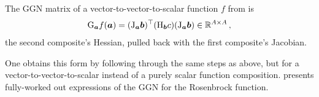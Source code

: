 \begin{definition}\label{def:vector_ggn}
  The GGN matrix of a vector-to-vector-to-scalar function $f$ from  is
  \begin{align*}
    \mathrm{G}_{{\bm{a}}} f({\bm{a}})
    =
    (\mathrm{J}_{{\bm{a}}} {\bm{b}})^{\top}
    (\mathrm{H}_{{\bm{b}}} c)
    (\mathrm{J}_{{\bm{a}}} {\bm{b}}) \in {\mathbb{R}}^{A \times A}\,,
  \end{align*}
  \ie the second composite's Hessian, pulled back with the first composite's Jacobian.
\end{definition}

One obtains this form by following through the same steps as above, but for a vector-to-vector-to-scalar instead of a purely scalar function composition.  presents fully-worked out expressions of the GGN for the Rosenbrock function.

